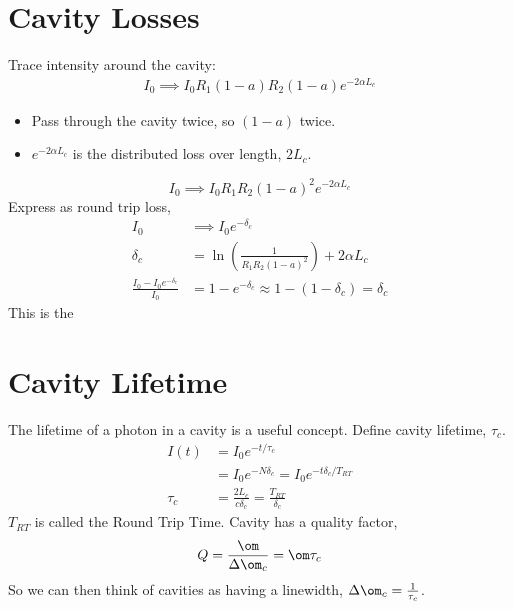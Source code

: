 \documentclass[a4paper, 11pt, normalem]{report}
\begin{document}
\section{Cavity Losses}
Trace intensity around the cavity:
\begin{align}
    I_0 \implies I_0R_1(1-a)R_2(1-a)e^{-2\alpha L_c}
\end{align}
\begin{multicols}{2}
\begin{itemize}
    \item Pass through the cavity twice, so $(1-a)$ twice. 
    \item $e^{-2\alpha L_c}$ is the distributed loss over length, $2L_c$.
\end{itemize}
\end{multicols}
\begin{equation}
    I_0 \implies I_0R_1R_2(1-a)^2e^{-2\alpha L_c}
\end{equation}
Express as round trip loss,
\begin{align}
    I_0 &\implies I_0e^{-\delta_c} \\
    \delta_c &= \ln\left(\frac{1}{R_1R_2(1-a)^2}\right)+2\alpha L_c \\
    \frac{I_0-I_0e^{-\delta_c}}{I_0} &= 1 - e^{-\delta_c} \approx 1-(1-\delta_c) = \delta_c
\end{align}
This is the 

\section{Cavity Lifetime}
The lifetime of a photon in a cavity is a useful concept. 
Define cavity lifetime, $\tau_c$.
\begin{align}
    I(t) &= I_0e^{-t/\tau_c} \\
         &= I_0e^{-N\delta_c} = I_0e^{-t\delta_c/T_{RT}} \\
    \tau_c &= \frac{2L_c}{c\delta_c} = \frac{T_{RT}}{\delta_c}
\end{align}
$T_{RT}$ is called the Round Trip Time.
Cavity has a quality factor, 
\begin{align}
    Q = \frac{\om}{\Delta\om_c} = \om\tau_c
\end{align}
So we can then think of cavities as having a linewidth, $\Delta\om_c = \frac{1}{\tau_c}$.
\end{document}

